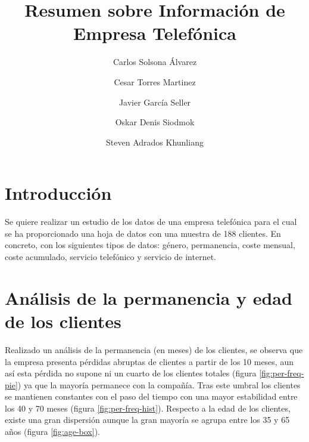 \documentclass[10pt,a4paper]{article}
\title{Resumen sobre Información de Empresa Telefónica}
\author{Carlos Solsona Álvarez \and Cesar Torres Martinez
\and Javier García Seller \and Oskar Denis Siodmok \and Steven Adrados Khunliang}
\begin{document}
\maketitle
\pagebreak
\section{Introducción}
Se quiere realizar un estudio de los datos de una empresa telefónica para el cual se ha proporcionado una hoja de datos con una muestra de 188 clientes.
En concreto, con los siguientes tipos de datos: género, permanencia, coste mensual, coste acumulado, servicio telefónico y servicio de internet.

\section{Análisis de la permanencia y edad de los clientes}
Realizado un análisis de la permanencia (en meses) de los clientes, se observa que la empresa presenta pérdidas abruptas de clientes a partir de los 10 meses, aun así esta pérdida no supone ni un cuarto de los clientes totales (figura \ref{fig:per-freq-pie}) ya que la mayoría permanece con la compañía. Tras este umbral los clientes se mantienen constantes con el paso del tiempo con una mayor estabilidad entre los 40 y 70 meses (figura \ref{fig:per-freq-hist}). Respecto a la edad de los clientes, existe una gran dispersión aunque la gran mayoría se agrupa entre los 35 y 65 años (figura \ref{fig:age-box}).
\end{document}
